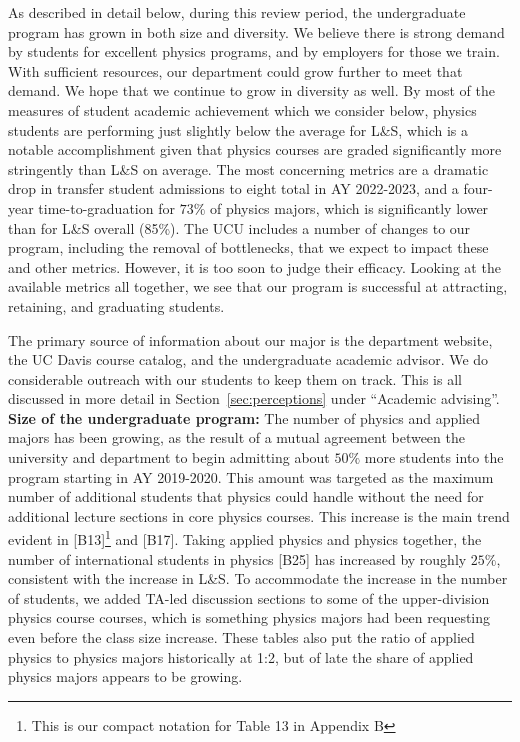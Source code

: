 \documentclass[12pt]{article}
\begin{document}
\noindent
As described in detail below, during this review period, the
undergraduate program has grown in both size and diversity.  We
believe there is strong demand by students for excellent physics
programs, and by employers for those we train.  With sufficient
resources, our department could grow further to meet that demand.  We
hope that we continue to grow in diversity as well.  By most of the
measures of student academic achievement which we consider below,
physics students are performing just slightly below the average for
L\&S, which is a notable accomplishment given that physics courses are
graded significantly more stringently than L\&S on average.  The most
concerning metrics are a dramatic drop in transfer student admissions
to eight total in AY 2022-2023, and a four-year time-to-graduation for
$73\%$ of physics majors, which is significantly lower than for L\&S
overall (85\%).  The UCU includes a number of changes to our program,
including the removal of bottlenecks, that we expect to impact these
and other metrics.  However, it is too soon to judge their efficacy.
Looking at the available metrics all together, we see that our program
is successful at attracting, retaining, and graduating students.

The primary source of information about our major is the department
website, the UC Davis course catalog, and the undergraduate academic
advisor.  We do considerable outreach with our students to keep them
on track.  This is all discussed in more detail in
Section~\ref{sec:perceptions} under ``Academic advising''.\\[3pt]

\noindent
{\bf Size of the undergraduate program:} The number of physics and
applied majors has been growing, as the result of a mutual agreement
between the university and department to begin admitting about $50\%$
more students into the program starting in AY 2019-2020.  This amount
was targeted as the maximum number of additional students that physics
could handle without the need for additional lecture sections in core
physics courses.  This increase is the main trend evident in 
[B13]\footnote{This is our compact notation for Table 13 in Appendix B}
and [B17]. Taking applied physics and physics together, the number of
international students in physics [B25] has increased by roughly
$25\%$, consistent with the increase in L\&S.  To accommodate the
increase in the number of students, we added TA-led discussion
sections to some of the upper-division physics course courses, which
is something physics majors had been requesting even before the class
size increase.  These tables also put the ratio of applied physics to
physics majors historically at 1:2, but of late the share of applied
physics majors appears to be growing.\\[3pt]
\end{document}
